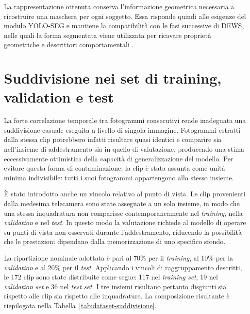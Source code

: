 La rappresentazione ottenuta conserva l'informazione geometrica necessaria a ricostruire una maschera per ogni soggetto. Essa risponde quindi alle esigenze del modulo YOLO-SEG e mantiene la compatibilità con le fasi successive di DEWS, nelle quali la forma segmentata viene utilizzata per ricavare proprietà geometriche e descrittori comportamentali \cite{Eng2008DEWS}.

\section{Suddivisione nei set di training, validation e test}

La forte correlazione temporale tra fotogrammi consecutivi rende inadeguata una suddivisione casuale eseguita a livello di singola immagine. Fotogrammi estratti dalla stessa clip potrebbero infatti risultare quasi identici e comparire sia nell'insieme di addestramento sia in quello di valutazione, producendo una stima eccessivamente ottimistica della capacità di generalizzazione del modello. Per evitare questa forma di contaminazione, la clip è stata assunta come unità minima indivisibile: tutti i suoi fotogrammi appartengono allo stesso insieme.

È stato introdotto anche un vincolo relativo al punto di vista. Le clip provenienti dalla medesima telecamera sono state assegnate a un solo insieme, in modo che una stessa inquadratura non comparisse contemporaneamente nel \textit{training}, nella \textit{validation} e nel \textit{test}. In questo modo la valutazione richiede al modello di operare su punti di vista non osservati durante l'addestramento, riducendo la possibilità che le prestazioni dipendano dalla memorizzazione di uno specifico sfondo.

La ripartizione nominale adottata è pari al 70\% per il \textit{training}, al 10\% per la \textit{validation} e al 20\% per il \textit{test}. Applicando i vincoli di raggruppamento descritti, le 172 clip sono state distribuite come segue: 117 nel \textit{training set}, 19 nel \textit{validation set} e 36 nel \textit{test set}. I tre insiemi risultano pertanto disgiunti sia rispetto alle clip sia rispetto alle inquadrature. La composizione risultante è riepilogata nella Tabella~\ref{tab:dataset-suddivisione}.

